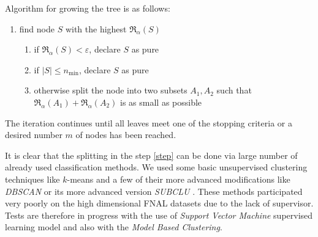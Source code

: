 Algorithm for growing the tree is as follows:
\begin{enumerate}
\item find node $S$ with the highest $\mathfrak{R}_\alpha(S)$
\begin{enumerate}
\item if $\mathfrak{R}_\alpha(S) < \varepsilon$, declare $S$ as pure
\item if $|S| \leq n_\mathrm{min}$, declare $S$ as pure
\item otherwise split the node into two subsets $A_1, A_2 $ such that $\mathfrak{R}_\alpha(A_1) + \mathfrak{R}_\alpha(A_2)$ is as small as possible \label{step}
\end{enumerate}
\end{enumerate}

\noindent The iteration continues until all leaves meet one of the stopping criteria or a desired number $m$ of nodes has been reached. 

It is clear that the splitting in the step \ref{step} can be done via large number of already used classification methods. We used some basic unsupervised clustering techniques like $k$-means and a few of their more advanced modifications like  \emph{DBSCAN} \cite{Ester} or its more advanced version \emph{SUBCLU} \cite{Kailing}. These methods  participated very poorly on the high dimensional FNAL datasets due to the lack of supervisor. Tests are therefore in progress with the use of \emph{Support Vector Machine} supervised learning model and also with the \emph{Model Based Clustering}. 






